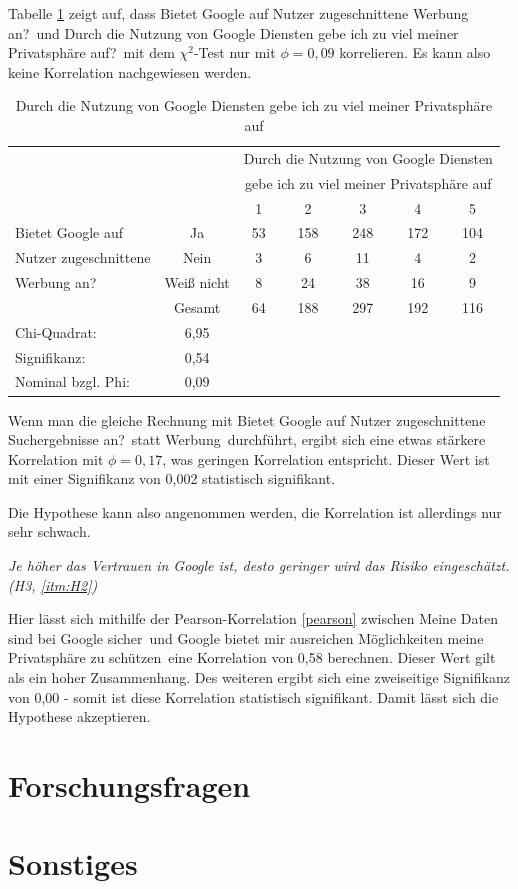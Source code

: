 Tabelle \ref{4sadsprivacy} zeigt auf, dass \glqq Bietet Google auf Nutzer zugeschnittene Werbung an?\grqq\ und \glqq Durch die Nutzung von Google Diensten gebe ich zu viel meiner Privatsphäre auf?\grqq\ mit dem $\chi^2$-Test nur mit $\phi = 0,09$ korrelieren. Es kann also keine Korrelation nachgewiesen werden.
\begin{table}
	\begin{tabular}[]{l c | c | c | c | c | c }
	& & \multicolumn{5}{c}{Durch die Nutzung von Google Diensten}\\
	& & \multicolumn{5}{c}{gebe ich zu viel meiner Privatsphäre auf}\\\hline
	& & 1 & 2 & 3 & 4 & 5\\\hline
	Bietet Google auf & Ja & 53 & 158 & 248 & 172 & 104 \\
	Nutzer zugeschnittene & Nein & 3 & 6 & 11 & 4 & 2 \\
	Werbung an? & Weiß nicht & 8 & 24 & 38 & 16 & 9 \\
	& Gesamt & 64 & 188 & 297 & 192 & 116\\ \hline \hline
	Chi-Quadrat: & 6,95 & & & & &\\
	Signifikanz: & 0,54 & & & & &\\
	Nominal bzgl. Phi: & 0,09&&&&&\\ \hline
	\end{tabular}
	\caption{Durch die Nutzung von Google Diensten gebe ich zu viel meiner Privatsphäre auf}\label{4sadsprivacy}
\end{table}

Wenn man die gleiche Rechnung mit \glqq Bietet Google auf Nutzer zugeschnittene Suchergebnisse an?\grqq\ statt \glqq Werbung\grqq\ durchführt, ergibt sich eine etwas stärkere Korrelation mit $\phi = 0,17$, was geringen Korrelation entspricht. Dieser Wert ist mit einer Signifikanz von 0,002 statistisch signifikant.

Die Hypothese kann also angenommen werden, die Korrelation ist allerdings nur sehr schwach.

\textit{Je höher das Vertrauen in Google ist, desto geringer wird das Risiko eingeschätzt. (H3, \ref{itm:H2})}

Hier lässt sich mithilfe der Pearson-Korrelation \ref{pearson} zwischen \glqq Meine Daten sind bei Google sicher\grqq\ und \glqq Google bietet mir ausreichen Möglichkeiten meine Privatsphäre zu schützen\grqq\ eine Korrelation von 0,58 berechnen. Dieser Wert gilt als ein hoher Zusammenhang. Des weiteren ergibt sich eine zweiseitige Signifikanz von 0,00 - somit ist diese Korrelation statistisch signifikant. Damit lässt sich die Hypothese akzeptieren.

\section{Forschungsfragen}

\section{Sonstiges}
